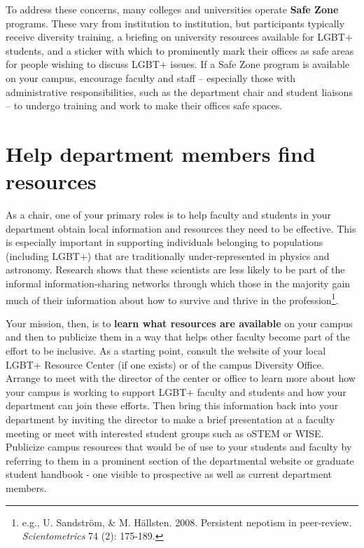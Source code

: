 To address these concerns, many colleges and universities operate \textbf{Safe Zone} programs. These vary from institution to institution, but participants typically receive diversity training, a briefing on university resources available for LGBT+ students, and a sticker with which to prominently mark their offices as safe areas for people wishing to discuss LGBT+ issues. If a Safe Zone program is available on your campus, encourage faculty and staff -- especially those with administrative responsibilities, such as the department chair and student liaisons -- to undergo training and work to make their offices safe spaces.


\section {Help department members find resources}
\label{find-resources}
As a chair, one of your primary roles is to help faculty and students in your department obtain local information and resources they need to be effective. This is especially important in supporting individuals belonging to populations (including LGBT+) that are traditionally under-represented in physics and astronomy. Research shows that these scientists are less likely to be part of the informal information-sharing networks through which those in the majority gain much of their information about how to survive and thrive in the profession\footnote{e.g., U. Sandstr\"{o}m, \& M. H\"{a}llsten. 2008. Persistent nepotism in peer-review. \emph{Scientometrics}\/ 74 (2): 175-189.}.

Your mission, then, is to \textbf{learn what resources are available} on your campus and then to publicize them in a way that helps other faculty become part of the effort to be inclusive. As a starting point, consult the website of your local LGBT+ Resource Center (if one exists) or of the campus Diversity Office. Arrange to meet with the director of the center or office to learn more about how your campus is working to support LGBT+ faculty and students and how your department can join these efforts. Then bring this information back into your department by inviting the director to make a brief presentation at a faculty meeting or meet with interested student groups such as oSTEM or WISE. Publicize campus resources that would be of use to your students and faculty by referring to them in a prominent section of the departmental website or graduate student handbook - one visible to prospective as well as current department members.


